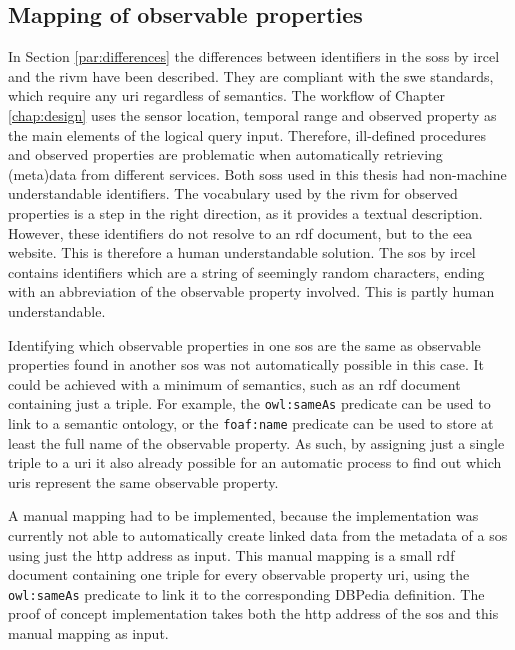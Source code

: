 \subsection{Mapping of observable properties}
In Section \ref{par:differences} the differences between identifiers in the \aclp{sos} by \ac{ircel} and the \ac{rivm} have been described. They are compliant with the \ac{swe} standards, which require any \ac{uri} regardless of semantics. The workflow of Chapter \ref{chap:design} uses the sensor location, temporal range and observed property as the main elements of the logical query input. Therefore, ill-defined procedures and observed properties are problematic when automatically retrieving (meta)data from different services. Both \aclp{sos} used in this thesis had non-machine understandable identifiers. The vocabulary used by the \ac{rivm} for observed properties is a step in the right direction, as it provides a textual description. However, these identifiers do not resolve to an \ac{rdf} document, but to the \ac{eea} website. This is therefore a human understandable solution. The \ac{sos} by \ac{ircel} contains identifiers which are a string of seemingly random characters, ending with an abbreviation of the observable property involved. This is partly human understandable.   

Identifying which observable properties in one \ac{sos} are the same as observable properties found in another \ac{sos} was not automatically possible in this case. It could be achieved with a minimum of semantics, such as an \ac{rdf} document containing just a triple. For example, the \texttt{owl:sameAs} predicate can be used to link to a semantic ontology, or the \texttt{foaf:name} predicate can be used to store at least the full name of the observable property. As such, by assigning just a single triple to a \ac{uri} it also already possible for an automatic process to find out which \acp{uri} represent the same observable property. 

 A manual mapping had to be implemented, because the implementation was currently not able to automatically create linked data from the metadata of a \ac{sos} using just the \ac{http} address as input. This manual mapping is a small \ac{rdf} document containing one triple for every observable property \ac{uri}, using the \texttt{owl:sameAs} predicate to link it to the corresponding DBPedia definition. The proof of concept implementation takes both the \ac{http} address of the \ac{sos} and this manual mapping as input.          

